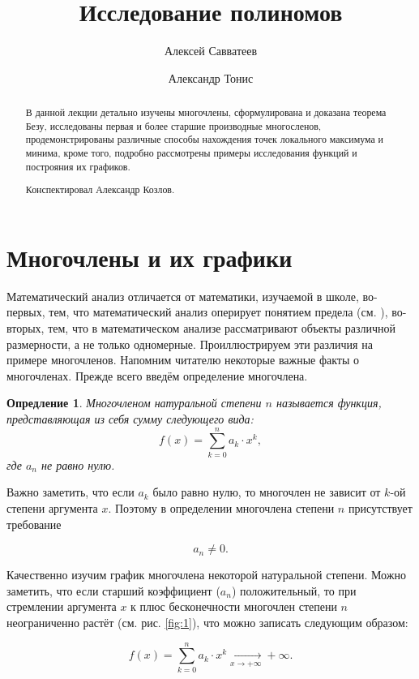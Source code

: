 \documentclass[12pt]{article}
\title{Исследование полиномов}
\author{Алексей Савватеев \and Александр Тонис}
\newtheorem{definition}{Опредление}[section]
\begin{document}
\maketitle
\begin{abstract}
В данной лекции детально изучены многочлены, сформулирована и доказана теорема Безу, исследованы первая и более старшие производные многосленов, продемонстрированы различные способы нахождения точек локального максимума и минима, кроме того, подробно рассмотрены примеры исследования функций и построяния их графиков.
\par
Конспектировал Александр Козлов. 
\end{abstract}
\newpage
\tableofcontents
\newpage
\section{Многочлены и их графики}
Математический анализ отличается от математики, изучаемой в школе, во\--первых, тем, что математический анализ оперирует понятием предела (см. \cite{lim_use}), во\--вторых, тем, что в математическом анализе рассматривают объекты различной размерности, а не только одномерные. Проиллюстрируем эти различия на примере многочленов. Напомним читателю некоторые важные факты о многочленах. Прежде всего введём определение многочлена.

\begin{definition}
	Многочленом натуральной степени $n$ называется функция, представляющая из себя сумму следующего вида:
	\begin{equation}
	f(x) = \sum_{k=0}^n{a_k \cdot x^k},
	\end{equation}
	где $a_n$ не равно нулю.
\end{definition}

Важно заметить, что если $a_k$ было равно нулю, то многочлен не зависит от $k$\--ой степени аргумента $x$. Поэтому в определении многочлена степени $n$ присутствует требование

\begin{equation}
a_n \ne 0.
\end{equation}

\par
Качественно изучим график многочлена некоторой натуральной степени. Можно заметить, что если старший коэффициент ($a_n$) положительный, то при стремлении аргумента $x$ к плюс бесконечности многочлен степени $n$ неограниченно растёт (см. рис. \ref{fig:1}), что можно записать следующим образом:

\begin{equation}
f(x) = \sum_{k=0}^n{a_k \cdot x^k} \underset{x\rightarrow+\infty}{\longrightarrow}+\infty.
\end{equation}
\end{document}
